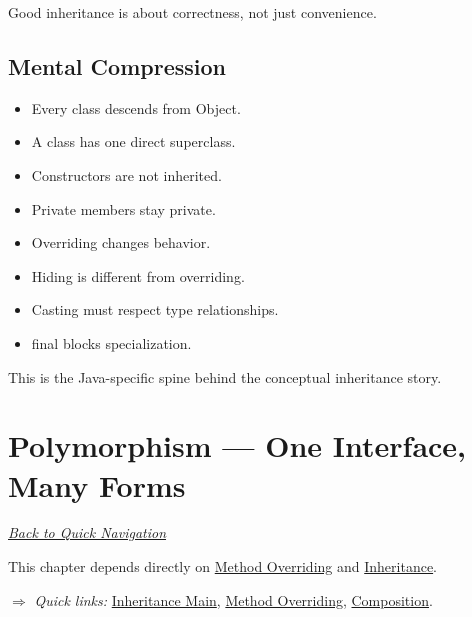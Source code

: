 \documentclass[11pt,a4paper]{book}
\begin{document}

\begin{rosettarule}
Good inheritance is about correctness,
not just convenience.
\end{rosettarule}


\section{Mental Compression}

\begin{itemize}
\item Every class descends from Object.
\item A class has one direct superclass.
\item Constructors are not inherited.
\item Private members stay private.
\item Overriding changes behavior.
\item Hiding is different from overriding.
\item Casting must respect type relationships.
\item final blocks specialization.
\end{itemize}


This is the Java-specific spine behind the conceptual inheritance story.

\chapter{Polymorphism --- One Interface, Many Forms}\label{chap:polymorphism}

\smallskip
\noindent
\hyperref[sec:quick_nav]{\emph{Back to Quick Navigation}}


This chapter depends directly on \hyperref[sec:method_overriding]{Method Overriding} and \hyperref[chap:inheritance]{Inheritance}.

\smallskip
\noindent
\textcolor{RosettaRoyalPurple}{$\Rightarrow$}
\emph{Quick links: }
\hyperref[chap:inheritance]{Inheritance Main},
\hyperref[sec:method_overriding]{Method Overriding},
\hyperref[chap:composition]{Composition}.
\end{document}
